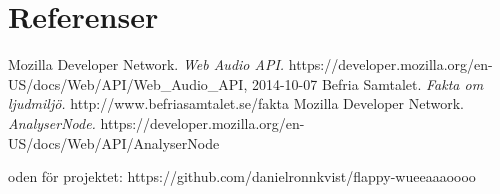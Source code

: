 \documentclass[12pt, titlepage, twoside, a4paper]{article}
\begin{document}
	\section{Referenser}
	\renewcommand{\addcontentsline}[3]{}%
  \renewcommand{\section}[2]{}%
  \begin{thebibliography}{1}
    Mozilla Developer Network.
    \emph{Web Audio API.}
    https://developer.mozilla.org/en-US/docs/Web/API/Web\_Audio\_API, 2014-10-07
    Befria Samtalet.
    \emph{Fakta om ljudmiljö.}
    http://www.befriasamtalet.se/fakta
    Mozilla Developer Network.
    \emph{AnalyserNode.}
    https://developer.mozilla.org/en-US/docs/Web/API/AnalyserNode
  \end{thebibliography}
  \section{Bilagor}
  Koden för projektet: https://github.com/danielronnkvist/flappy-wueeaaaoooo
\end{document}
